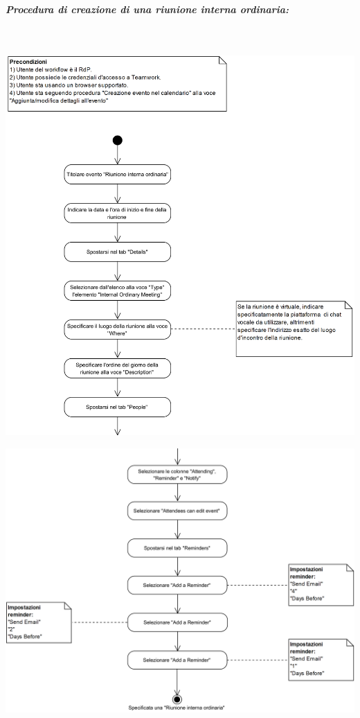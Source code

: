 \begin{samepage}
	\subparagraph{Procedura di creazione di una riunione interna ordinaria:}\mbox{}\\
	
	\begin{center}
		\includegraphics[width=15cm]{../../documenti/NormeDiProgetto/DiagrammiProcedure/RiunioneInternaOrdinaria1.png}
	\end{center}
\end{samepage}
\begin{center}
	\includegraphics[width=15cm]{../../documenti/NormeDiProgetto/DiagrammiProcedure/RiunioneInternaOrdinaria2.png}
\end{center}

